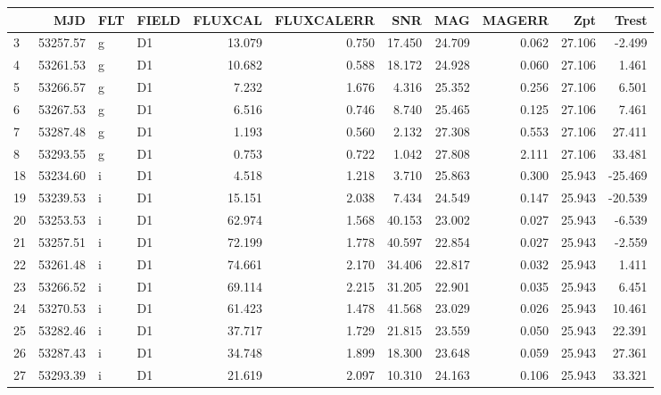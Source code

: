 \begin{tabular}{lrllrrrrrrr}
\toprule
{} &       MJD & FLT & FIELD &  FLUXCAL &  FLUXCALERR &     SNR &     MAG &  MAGERR &     Zpt &    Trest \\
\midrule
3  &  53257.57 &   g &    D1 &   13.079 &       0.750 &  17.450 &  24.709 &   0.062 &  27.106 &   -2.499 \\
4  &  53261.53 &   g &    D1 &   10.682 &       0.588 &  18.172 &  24.928 &   0.060 &  27.106 &    1.461 \\
5  &  53266.57 &   g &    D1 &    7.232 &       1.676 &   4.316 &  25.352 &   0.256 &  27.106 &    6.501 \\
6  &  53267.53 &   g &    D1 &    6.516 &       0.746 &   8.740 &  25.465 &   0.125 &  27.106 &    7.461 \\
7  &  53287.48 &   g &    D1 &    1.193 &       0.560 &   2.132 &  27.308 &   0.553 &  27.106 &   27.411 \\
8  &  53293.55 &   g &    D1 &    0.753 &       0.722 &   1.042 &  27.808 &   2.111 &  27.106 &   33.481 \\
18 &  53234.60 &   i &    D1 &    4.518 &       1.218 &   3.710 &  25.863 &   0.300 &  25.943 &  -25.469 \\
19 &  53239.53 &   i &    D1 &   15.151 &       2.038 &   7.434 &  24.549 &   0.147 &  25.943 &  -20.539 \\
20 &  53253.53 &   i &    D1 &   62.974 &       1.568 &  40.153 &  23.002 &   0.027 &  25.943 &   -6.539 \\
21 &  53257.51 &   i &    D1 &   72.199 &       1.778 &  40.597 &  22.854 &   0.027 &  25.943 &   -2.559 \\
22 &  53261.48 &   i &    D1 &   74.661 &       2.170 &  34.406 &  22.817 &   0.032 &  25.943 &    1.411 \\
23 &  53266.52 &   i &    D1 &   69.114 &       2.215 &  31.205 &  22.901 &   0.035 &  25.943 &    6.451 \\
24 &  53270.53 &   i &    D1 &   61.423 &       1.478 &  41.568 &  23.029 &   0.026 &  25.943 &   10.461 \\
25 &  53282.46 &   i &    D1 &   37.717 &       1.729 &  21.815 &  23.559 &   0.050 &  25.943 &   22.391 \\
26 &  53287.43 &   i &    D1 &   34.748 &       1.899 &  18.300 &  23.648 &   0.059 &  25.943 &   27.361 \\
27 &  53293.39 &   i &    D1 &   21.619 &       2.097 &  10.310 &  24.163 &   0.106 &  25.943 &   33.321 \\

\end{tabular}
